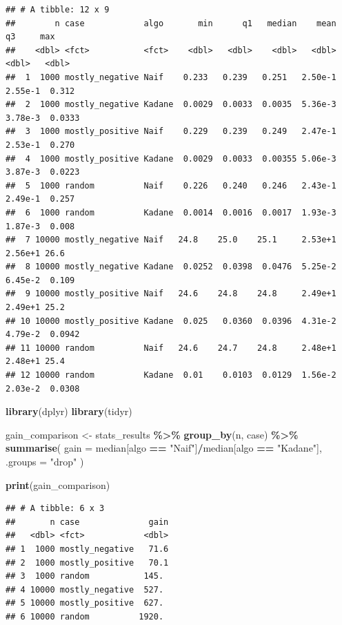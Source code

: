 \documentclass[
]{article}
\newenvironment{Shaded}{\begin{snugshade}}{\end{snugshade}}
\newcommand{\AttributeTok}[1]{\textcolor[rgb]{0.13,0.29,0.53}{#1}}
\newcommand{\FunctionTok}[1]{\textcolor[rgb]{0.13,0.29,0.53}{\textbf{#1}}}
\newcommand{\NormalTok}[1]{#1}
\newcommand{\OtherTok}[1]{\textcolor[rgb]{0.56,0.35,0.01}{#1}}
\newcommand{\SpecialCharTok}[1]{\textcolor[rgb]{0.81,0.36,0.00}{\textbf{#1}}}
\newcommand{\StringTok}[1]{\textcolor[rgb]{0.31,0.60,0.02}{#1}}
\begin{document}
\begin{verbatim}
## # A tibble: 12 x 9
##        n case            algo       min      q1   median    mean      q3     max
##    <dbl> <fct>           <fct>    <dbl>   <dbl>    <dbl>   <dbl>   <dbl>   <dbl>
##  1  1000 mostly_negative Naif    0.233   0.239   0.251   2.50e-1 2.55e-1  0.312 
##  2  1000 mostly_negative Kadane  0.0029  0.0033  0.0035  5.36e-3 3.78e-3  0.0333
##  3  1000 mostly_positive Naif    0.229   0.239   0.249   2.47e-1 2.53e-1  0.270 
##  4  1000 mostly_positive Kadane  0.0029  0.0033  0.00355 5.06e-3 3.87e-3  0.0223
##  5  1000 random          Naif    0.226   0.240   0.246   2.43e-1 2.49e-1  0.257 
##  6  1000 random          Kadane  0.0014  0.0016  0.0017  1.93e-3 1.87e-3  0.008 
##  7 10000 mostly_negative Naif   24.8    25.0    25.1     2.53e+1 2.56e+1 26.6   
##  8 10000 mostly_negative Kadane  0.0252  0.0398  0.0476  5.25e-2 6.45e-2  0.109 
##  9 10000 mostly_positive Naif   24.6    24.8    24.8     2.49e+1 2.49e+1 25.2   
## 10 10000 mostly_positive Kadane  0.025   0.0360  0.0396  4.31e-2 4.79e-2  0.0942
## 11 10000 random          Naif   24.6    24.7    24.8     2.48e+1 2.48e+1 25.4   
## 12 10000 random          Kadane  0.01    0.0103  0.0129  1.56e-2 2.03e-2  0.0308
\end{verbatim}

\begin{Shaded}
\begin{Highlighting}[]
\FunctionTok{library}\NormalTok{(dplyr)}
\FunctionTok{library}\NormalTok{(tidyr)}

\NormalTok{gain\_comparison }\OtherTok{\textless{}{-}}\NormalTok{ stats\_results }\SpecialCharTok{\%\textgreater{}\%}
  \FunctionTok{group\_by}\NormalTok{(n, case) }\SpecialCharTok{\%\textgreater{}\%}
  \FunctionTok{summarise}\NormalTok{(}
    \AttributeTok{gain =}\NormalTok{ median[algo }\SpecialCharTok{==} \StringTok{"Naif"}\NormalTok{]}\SpecialCharTok{/}\NormalTok{median[algo }\SpecialCharTok{==} \StringTok{"Kadane"}\NormalTok{],}
    \AttributeTok{.groups =} \StringTok{"drop"}
\NormalTok{  )}

\FunctionTok{print}\NormalTok{(gain\_comparison)}
\end{Highlighting}
\end{Shaded}

\begin{verbatim}
## # A tibble: 6 x 3
##       n case              gain
##   <dbl> <fct>            <dbl>
## 1  1000 mostly_negative   71.6
## 2  1000 mostly_positive   70.1
## 3  1000 random           145. 
## 4 10000 mostly_negative  527. 
## 5 10000 mostly_positive  627. 
## 6 10000 random          1920.
\end{verbatim}
\end{document}
